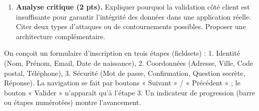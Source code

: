 \documentclass[11pt]{article}
\begin{document}
\begin{exercice}
\begin{enumerate}
    \item \textbf{Analyse critique (2 pts).} Expliquer pourquoi la validation côté client est insuffisante pour garantir l'intégrité des données dans une application réelle. Citer deux types d'attaques ou de contournements possibles. Proposer une architecture complémentaire.
\end{enumerate}
\end{exercice}

\begin{exercice}
On conçoit un formulaire d'inscription en trois étapes (fieldsets) : 1. Identité (Nom, Prénom, Email, Date de naissance), 2. Coordonnées (Adresse, Ville, Code postal, Téléphone), 3. Sécurité (Mot de passe, Confirmation, Question secrète, Réponse). La navigation se fait par boutons « Suivant » / « Précédent » ; le bouton « Valider » n'apparaît qu'à l'étape 3. Un indicateur de progression (barre ou étapes numérotées) montre l'avancement.


\end{exercice}
\end{document}

